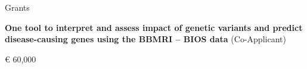 \begin{rubric}{Grants}

\entry*[07 Mar 2016]%
	\textbf{One tool to interpret and assess impact of genetic variants and predict disease-causing genes using the BBMRI – BIOS data} (Co-Applicant) \par
	€ 60,000
\end{rubric}

